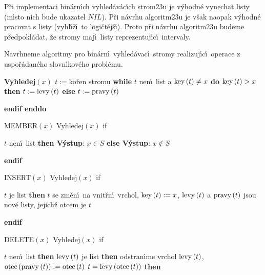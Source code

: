 \flushpar P\v ri implementaci bin\'arn\'\i ch vyhled\'av\'ac\'\i ch 
strom\accent23u je v\'yhodn\'e vynechat listy (m\'\i sto nich bude 
ukazatel $NIL$). P\v ri n\'avrhu algoritm\accent23u je v\v sak 
naopak v\'yhodn\'e 
pracovat s listy (vyhl\'\i\v z\'\i\ to logi\v ct\v ej\v s\'\i ). Proto p\v ri n\'avrhu 
algoritm\accent23u budeme p\v redpokl\'adat, \v ze stromy maj\'\i\ 
listy reprezentuj\'\i c\'\i\ intervaly.
\medskip

\flushpar Navrhneme algoritmy pro bin\'arn\'\i\ vyhled\'avac\'\i\ stromy 
rea\-lizuj\'\i\-c\'\i\ operace z uspo\v r\'adan\'eho slovn\'\i kov\'eho probl\'emu.
\medskip

{\bf Vyhledej$\left(x\right)$\newline 
$t:=$}ko\v ren stromu\newline 
{\bf while} $t$ nen\'\i\ list a $\operatorname{key}\left(t\right)\ne x$ {\bf do}\newline 
\phantom{---}{\bf if} $\operatorname{key}\left(t\right)>x$ {\bf then} $t:=\operatorname{levy}\left(t\right)$ {\bf else} $t:=\operatorname{pravy}\left(t\right)$ {\bf endif\newline 
enddo
\medskip

MEMBER$\left(x\right)$\newline 
Vyhledej$\left(x\right)$\newline 
if} $t$ nen\'\i\ list {\bf then V\'ystup}: $x\in S$ {\bf else V\'ystup}: $
x\notin S$ {\bf endif
\medskip

INSERT$\left(x\right)$\newline 
Vyhledej$\left(x\right)$\newline 
if} $t$ je list {\bf then}\newline 
$t$ se zm\v en\'\i\ na vnit\v rn\'\i\ vrchol, $\operatorname{key}\left(t\right):=x$,\newline 
$\operatorname{levy}\left(t\right)$ a $\operatorname{pravy}\left(t\right)$ jsou nov\'e listy, jejich\v z otcem je $t$\newline 
{\bf endif
\medskip

DELETE$\left(x\right)$\newline 
Vyhledej$\left(x\right)$\newline 
if} $t$ nen\'\i\ list {\bf then}\newline 
\phantom{---}{\bf if} $\operatorname{levy}\left(t\right)$ je list {\bf then\newline}
\phantom{------}odstran\'\i me vrchol $\operatorname{levy}\left(t\right)$, $\operatorname{otec}\left(\operatorname{pravy}\left(t\right)\right):=\operatorname{otec}\left(t\right)$\newline 
\phantom{------}{\bf if} $t=\operatorname{levy}\left(\operatorname{otec}\left(t\right)\right)$ {\bf then}\newline
